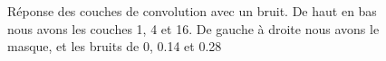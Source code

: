 \documentclass[12pt]{article}
\begin{document}
\begin{figure}[htb]
  \hfill
  \hfill
  \hfill
  \caption{Réponse des couches de convolution avec un bruit. De haut en bas nous avons les couches 1, 4 et 16. De gauche à droite nous avons le masque, et les bruits de 0, 0.14 et 0.28}\label{fig:occlus_dynamic}
\end{figure}
\end{document}
